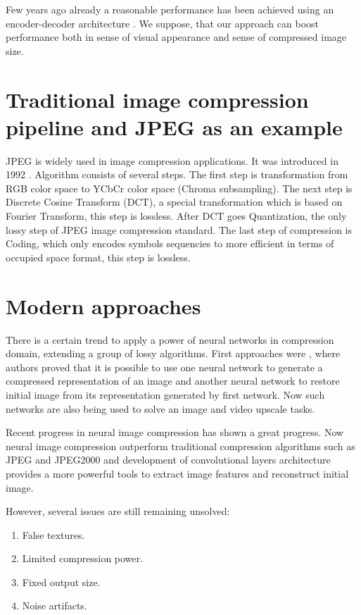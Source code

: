 Few years ago already a reasonable performance has been achieved using an encoder-decoder architecture \cite{theis_lossy_2017}. We suppose, that our approach can boost performance both in sense of visual appearance and sense of compressed image size.

\section{Traditional image compression pipeline and JPEG as an example}

JPEG is widely used in image compression applications. It was introduced in 1992 \cite{wallace_jpeg_1992}. Algorithm consists of several steps. The first step is transformation from RGB color space to YCbCr color space (Chroma subsampling). The next step is Discrete Cosine Transform (DCT), a special transformation which is based on Fourier Transform, this step is lossless. After DCT goes Quantization, the only lossy step of JPEG image compression standard. The last step of compression is Coding, which only encodes symbols sequencies to more efficient in terms of occupied space format, this step is lossless.

\section{Modern approaches}

There is a certain trend to apply a power of neural networks in compression domain, extending a group of lossy algorithms. First approaches were \cite{himentzer_high_fidelity_2020 Balle_Laparra_Simoncelli_2017, theis_lossy_2017, Toderici_Vincent_Johnston_Hwang_Minnen_Shor_Covell_2017}, where authors proved that it is possible to use one neural network to generate a compressed representation of an image and another neural network to restore initial image from its representation generated by first network. Now such networks are also being used to solve an image and video upscale tasks.

Recent progress in neural image compression has shown a great progress. Now neural image compression outperform traditional compression algorithms such as JPEG and JPEG2000 and development of convolutional layers architecture provides a more powerful tools to extract image features and reconstruct initial image.

However, several issues are still remaining unsolved:

\begin{enumerate}
    \item False textures.
    \item Limited compression power.
    \item Fixed output size.
    \item Noise artifacts.
\end{enumerate}

